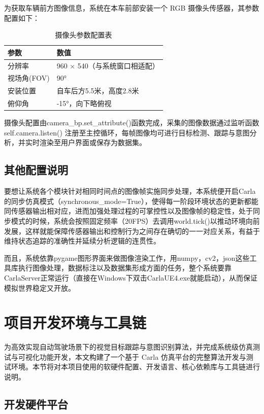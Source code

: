 为获取车辆前方图像信息，系统在本车前部安装一个 RGB 摄像头传感器，其参数配置如下：

\begin{table}[htbp]
  \caption{摄像头参数配置表}
  \label{tab:camera_params}
  \centering
  \begin{tabular}{ll}
    \toprule
    参数 & 数值 \\
    \midrule
    分辨率 & 960 × 540（与系统窗口相适配） \\
    视场角(FOV) & 90° \\
    安装位置 & 自车后方5.5米，高度2.8米 \\
    俯仰角 & -15°，向下略俯视 \\
    \bottomrule
  \end{tabular}
\end{table}

摄像头配置由camera\_bp.set\_attribute()函数完成，采集的图像数据通过监听函数 self.camera.listen() 注册至主控循环，每帧图像均可进行目标检测、跟踪与意图分析，并实时渲染至用户界面或保存为数据集。

\subsection{其他配置说明}

要想让系统各个模块针对相同时间点的图像帧实施同步处理，本系统便开启Carla的同步仿真模式（synchronous\_mode=True），使得每一阶段环境状态的更新都能同传感器输出相对应，进而加强处理过程的可掌控性以及图像帧的稳定性，处于同步模式的时候，系统会按照固定频率（20FPS）去调用world.tick()以推动环境向前发展，这样就能保障传感器输出和控制行为之间存在确切的一一对应关系，有益于维持状态追踪的准确性并延续分析逻辑的连贯性。

而且，系统依靠pygame图形界面来做图像渲染工作，用numpy，cv2，json这些工具库执行图像处理，数据标注以及数据集形成方面的任务，整个系统要靠CarlaServer正常运行（直接在Windows下双击CarlaUE4.exe就能启动），从而保证模拟世界稳定又开放。

\section{项目开发环境与工具链}

为高效实现自动驾驶场景下的视觉目标跟踪与意图识别算法，并完成系统级仿真测试与可视化功能开发，本文构建了一个基于 Carla 仿真平台的完整算法开发与测试环境。本节将对本项目使用的软硬件配置、开发语言、核心依赖库与工具链进行说明。

\subsection{开发硬件平台}


